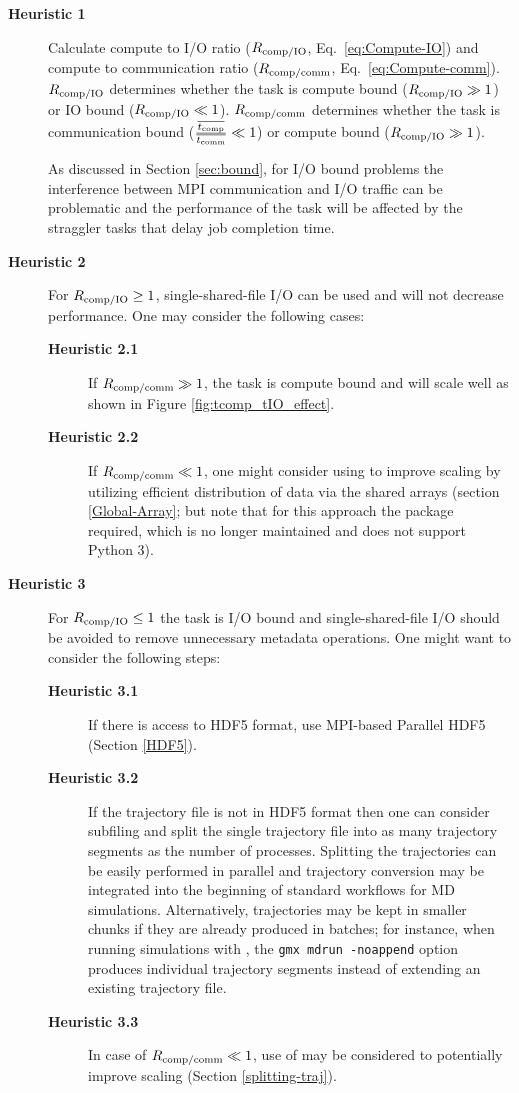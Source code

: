 \begin{description}
\item[\textbf{Heuristic 1}] Calculate compute to I/O ratio ($R_{\text{comp/IO}}$, Eq.~\ref{eq:Compute-IO}) and compute to communication ratio ($R_{\text{comp/comm}}$, Eq.~\ref{eq:Compute-comm}).
  $R_{\text{comp/IO}}$ determines whether the task is compute bound ($R_{\text{comp/IO}} \gg 1$) or IO bound ($R_{\text{comp/IO}} \ll 1$).
  $R_{\text{comp/comm}}$ determines whether the task is communication bound ($\frac{\overline{{t}_{\text{comp}}}}{\overline{t_{\text{comm}}}} \ll 1$) or compute bound ($R_{\text{comp/IO}} \gg 1$).

  As discussed in Section \ref{sec:bound}, for I/O bound problems the interference between MPI communication and I/O traffic can be problematic \cite{VMD2013, Brown:2018ab} and the performance of the task will be affected by the straggler tasks that delay job completion time.
  
\item[\textbf{Heuristic 2}] For $R_{\text{comp/IO}} \ge 1$, single-shared-file I/O can be used and will not decrease performance. One may consider the following cases: 
  \begin{description}
  \item[\textbf{Heuristic 2.1}] If $R_{\text{comp/comm}} \gg 1$, the task is compute bound and will scale well as shown in Figure \ref{fig:tcomp_tIO_effect}. 
  \item[\textbf{Heuristic 2.2}] If $R_{\text{comp/comm}} \ll 1$, one might consider using  to improve scaling by utilizing efficient distribution of data via the shared arrays (section \ref{Global-Array}; but note that for this approach the  package required, which is no longer maintained and does not support Python 3).
  \end{description}
\item[\textbf{Heuristic 3}] For $R_{\text{comp/IO}} \le 1$ the task is I/O bound and single-shared-file I/O should be avoided to remove unnecessary metadata operations.
  One might want to consider the following steps:  
  \begin{description}
    \item[\textbf{Heuristic 3.1}] If there is access to HDF5 format, use MPI-based Parallel HDF5 (Section \ref{HDF5}). 
    \item[\textbf{Heuristic 3.2}] If the trajectory file is not in HDF5 format then one can consider subfiling and split the single trajectory file into as many trajectory segments as the number of processes.
      Splitting the trajectories can be easily performed in parallel and trajectory conversion may be integrated into the beginning of standard workflows for MD simulations.
      Alternatively, trajectories may be kept in smaller chunks if they are already produced in batches; for instance, when running simulations with  \cite{Abraham:2015aa}, the \texttt{gmx mdrun -noappend} option produces individual trajectory segments instead of extending an existing trajectory file.
    \item[\textbf{Heuristic 3.3}] In case of $R_{\text{comp/comm}} \ll 1$, use of  may be considered to potentially improve scaling (Section \ref{splitting-traj}).
  \end{description}
\end{description}
